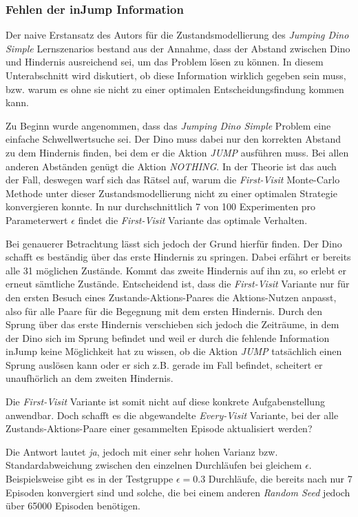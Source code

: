 \subsubsection*{Fehlen der \glqq inJump\grqq{} Information}
Der naive Erstansatz des Autors für die Zustandsmodellierung des \textit{Jumping Dino Simple} Lernszenarios bestand aus der Annahme, dass der Abstand zwischen Dino und Hindernis ausreichend sei, um das Problem lösen zu können. In diesem Unterabschnitt wird diskutiert, ob diese Information wirklich gegeben sein muss, bzw. warum es ohne sie nicht zu einer optimalen Entscheidungsfindung kommen kann.
\par 
Zu Beginn wurde angenommen, dass das \textit{Jumping Dino Simple} Problem eine einfache Schwellwertsuche sei. Der Dino muss dabei nur den korrekten Abstand zu dem Hindernis finden, bei dem er die Aktion \textit{JUMP} ausführen muss. Bei allen anderen Abständen genügt die Aktion \textit{NOTHING}. In der Theorie ist das auch der Fall, deswegen warf sich das Rätsel auf, warum die \textit{First-Visit} Monte-Carlo Methode unter dieser Zustandsmodellierung nicht zu einer optimalen Strategie konvergieren konnte. In nur durchschnittlich 7 von 100 Experimenten pro Parameterwert $\epsilon$ findet die \textit{First-Visit} Variante das optimale Verhalten.
\par 
Bei genauerer Betrachtung lässt sich jedoch der Grund hierfür finden. Der Dino schafft es beständig über das erste Hindernis zu springen. Dabei erfährt er bereits alle 31 möglichen Zustände. Kommt das zweite Hindernis auf ihn zu, so erlebt er erneut sämtliche Zustände. Entscheidend ist, dass die \textit{First-Visit} Variante nur für den ersten Besuch eines Zustands-Aktions-Paares die Aktions-Nutzen anpasst, also für alle Paare für die Begegnung mit dem ersten Hindernis. Durch den Sprung über das erste Hindernis verschieben sich jedoch die Zeiträume, in dem der Dino sich im Sprung befindet und weil er durch die fehlende Information \glqq inJump\grqq{} keine Möglichkeit hat zu wissen, ob die Aktion \textit{JUMP} tatsächlich einen Sprung auslösen kann oder er sich z.B. gerade im Fall befindet, scheitert er unaufhörlich an dem zweiten Hindernis.
\par 
Die \textit{First-Visit} Variante ist somit nicht auf diese konkrete Aufgabenstellung anwendbar. Doch schafft es die abgewandelte \textit{Every-Visit} Variante, bei der alle Zustands-Aktions-Paare einer gesammelten Episode aktualisiert werden? \par 
Die Antwort lautet \textit{ja}, jedoch mit einer sehr hohen Varianz bzw. Standardabweichung zwischen den einzelnen Durchläufen bei gleichem $\epsilon$. Beispielsweise gibt es in der Testgruppe $\epsilon = 0.3$ Durchläufe, die bereits nach nur 7 Episoden konvergiert sind und solche, die bei einem anderen \textit{Random Seed} jedoch über 65000 Episoden benötigen.


